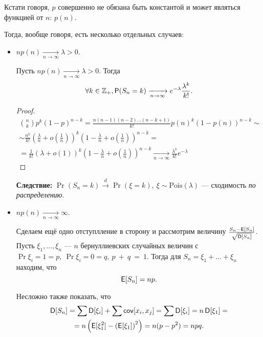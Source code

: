Кстати говоря, $p$ совершенно не обязана быть константой и может являться функцией от $n$: $p(n)$.

Тогда, вообще говоря, есть несколько отдельных случаев:

\begin{itemize}
    \item
        $np(n) \xrightarrow[n\to\infty]{} \lambda > 0$.

        \begin{theorem}[Пуассон]

            Пусть $np(n) \xrightarrow[n\to\infty]{} \lambda > 0$.
            Тогда
                \[
                    \forall k \in \Z_+, \Pr(S_n = k) \xrightarrow[n\to\infty]{} e^{-\lambda}\frac{\lambda^k}{k!}.
                \]
        \end{theorem}
        \begin{proof}
            \begin{multline*}
                \binom{n}{k}p^k(1-p)^{n-k} =
                \frac{n(n-1)(n-2)\ldots(n-k+1)}{k!}p(n)^k(1-p(n))^{n-k} \sim\\\sim
                \frac{n^k}{k!}\left(\frac{\lambda}{n}+o\left(\frac{1}{n}\right)\right)^k\left( 1-\frac{\lambda}{n}+o\left( \frac{1}{n} \right) \right)^{n-k} =\\=
                \frac{1}{k!}\left(\lambda+o\left(1\right)\right)^k\left( 1-\frac{\lambda}{n}+o\left( \frac{1}{n} \right) \right)^{n-k} \xrightarrow[n\to\infty]{}
                \frac{\lambda^k}{k!}e^{-\lambda}
            \end{multline*}
        \end{proof}
        \textbf{Следствие:} $\Pr(S_n = k) \overset{d}{\to} \Pr(\xi = k),\ \xi \sim \mathrm{Pois}(\lambda)$ --- сходимость \emph{по распределению}.

    \item
        $np(n) \xrightarrow[n\to\infty]{} \infty$.

        Сделаем ещё одно отступлление в сторону и рассмотрим величину $\frac{S_n - \E[S_n]}{\sqrt{\D[S_n]}}$.
        Пусть \(\xi_1, \ldots, \xi_n \) --- $ n $ бернуллиевских случайных величин с \(\Pr{\xi_i = 1} = p,\ \Pr{\xi_i = 0} = q,\ p~+~q~=~1. \) Тогда для \(S_n = \xi_1 + \ldots + \xi_n \) 
        находим, что
        \[
            \E[S_n] = np.
        \]

        Несложно также показать, что
        \begin{multline*}
            \D[S_n] = \sum\D[\xi_i] + \sum\cov[x_i, x_j] = \sum\D[\xi_i] = n\D[\xi_1] =\\= n\left( \E[\xi_1^2]-\left( \E[\xi_1] \right)^2 \right) = n(p - p^2) = npq.
        \end{multline*}


\end{itemize}
